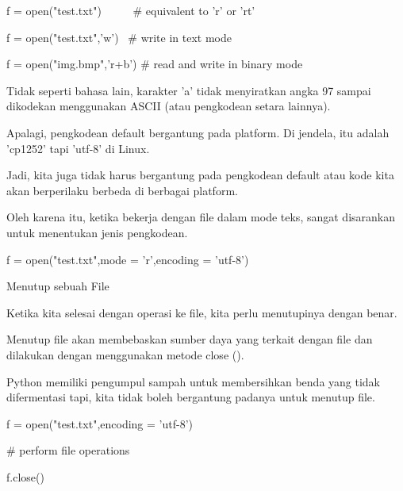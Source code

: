 \vspace{12pt}
\noindent 
f = open("test.txt")~~~~~  $  \#  $ equivalent to 'r' or 'rt' \par
\noindent 
f = open("test.txt",'w')~  $  \#  $ write in text mode \par
\noindent 
f = open("img.bmp",'r+b')  $  \#  $ read and write in binary mode \par
\vspace{12pt}
\noindent 
Tidak seperti bahasa lain, karakter 'a' tidak menyiratkan angka 97 sampai dikodekan menggunakan ASCII (atau pengkodean setara lainnya). \par
\vspace{12pt}
\noindent 
Apalagi, pengkodean default bergantung pada platform. Di jendela, itu adalah 'cp1252' tapi 'utf-8' di Linux. \par
\vspace{12pt}
\noindent 
Jadi, kita juga tidak harus bergantung pada pengkodean default atau kode kita akan berperilaku berbeda di berbagai platform. \par
\vspace{12pt}
\noindent 
Oleh karena itu, ketika bekerja dengan file dalam mode teks, sangat disarankan untuk menentukan jenis pengkodean. \par
\vspace{12pt}
\noindent 
f = open("test.txt",mode = 'r',encoding = 'utf-8') \par
\vspace{12pt}
\noindent 
Menutup sebuah File \par
\vspace{12pt}
\noindent 
Ketika kita selesai dengan operasi ke file, kita perlu menutupinya dengan benar. \par
\vspace{12pt}
\noindent 
Menutup file akan membebaskan sumber daya yang terkait dengan file dan dilakukan dengan menggunakan metode close (). \par
\vspace{12pt}
\noindent 
Python memiliki pengumpul sampah untuk membersihkan benda yang tidak difermentasi tapi, kita tidak boleh bergantung padanya untuk menutup file. \par
\noindent 
f = open("test.txt",encoding = 'utf-8') \par
\noindent 
 $  \#  $ perform file operations \par
\noindent 
f.close() \par
\vspace{16pt}
\noindent 
